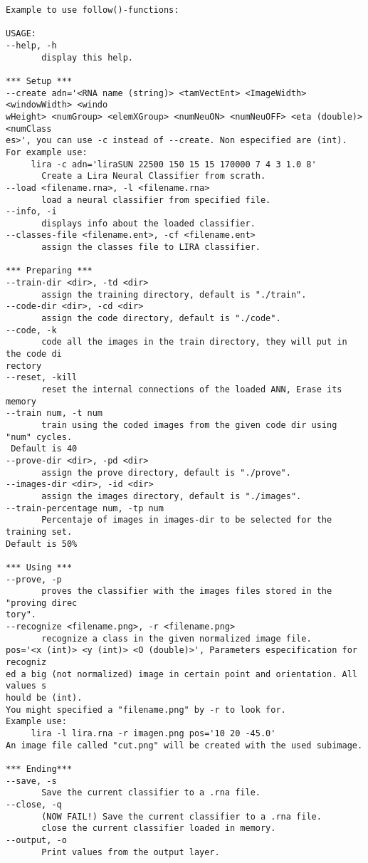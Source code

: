 \begin{verbatim}
Example to use follow()-functions:

USAGE:
--help, -h
       display this help.

*** Setup ***
--create adn='<RNA name (string)> <tamVectEnt> <ImageWidth> <windowWidth> <windo
wHeight> <numGroup> <elemXGroup> <numNeuON> <numNeuOFF> <eta (double)> <numClass
es>', you can use -c instead of --create. Non especified are (int).
For example use: 
	 lira -c adn='liraSUN 22500 150 15 15 170000 7 4 3 1.0 8'  
       Create a Lira Neural Classifier from scrath.
--load <filename.rna>, -l <filename.rna>
       load a neural classifier from specified file.
--info, -i
       displays info about the loaded classifier.
--classes-file <filename.ent>, -cf <filename.ent>
       assign the classes file to LIRA classifier.

*** Preparing ***
--train-dir <dir>, -td <dir>
       assign the training directory, default is "./train".
--code-dir <dir>, -cd <dir>
       assign the code directory, default is "./code".
--code, -k
       code all the images in the train directory, they will put in the code di
rectory
--reset, -kill
       reset the internal connections of the loaded ANN, Erase its memory
--train num, -t num
       train using the coded images from the given code dir using "num" cycles.
 Default is 40
--prove-dir <dir>, -pd <dir>
       assign the prove directory, default is "./prove".
--images-dir <dir>, -id <dir>
       assign the images directory, default is "./images".
--train-percentage num, -tp num
       Percentaje of images in images-dir to be selected for the training set. 
Default is 50%

*** Using ***
--prove, -p
       proves the classifier with the images files stored in the "proving direc
tory".
--recognize <filename.png>, -r <filename.png>
       recognize a class in the given normalized image file.
pos='<x (int)> <y (int)> <O (double)>', Parameters especification for recogniz
ed a big (not normalized) image in certain point and orientation. All values s
hould be (int).
You might specified a "filename.png" by -r to look for.
Example use: 
	 lira -l lira.rna -r imagen.png pos='10 20 -45.0' 
An image file called "cut.png" will be created with the used subimage.

*** Ending***
--save, -s
       Save the current classifier to a .rna file.
--close, -q
       (NOW FAIL!) Save the current classifier to a .rna file.
       close the current classifier loaded in memory.
--output, -o
       Print values from the output layer.


\end{verbatim}
